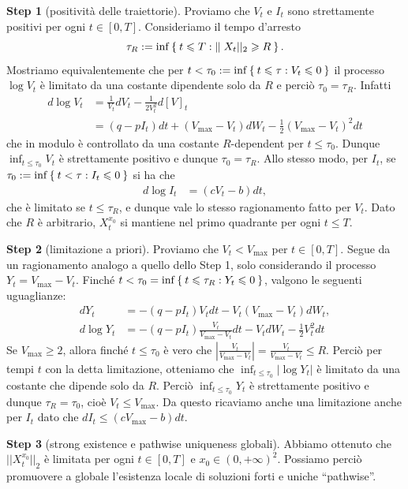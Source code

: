 \documentclass[12pt,a4paper,oneside]{article}
\renewcommand{\geq}{\geqslant}
\renewcommand{\leq}{\leqslant}
\theoremstyle{definition}
\begin{document}
\textbf{Step 1} (positività delle traiettorie). Proviamo che $V_t$ e $I_t$ sono strettamente positivi per ogni $t\in [0,T]$. Consideriamo il tempo d'arresto $$\tau_R := \inf \Set{t\leq T : ||X_t||_2\geq R}.$$
Mostriamo equivalentemente che per $t< \tau_0:=\inf\Set{t\leq \tau : V_t \leq 0}$ il processo $\log V_t$ è limitato da una costante dipendente solo da $R$ e perciò $\tau_0=\tau_R$. Infatti \begin{align*}
d\log V_t & = \frac{1}{V_t} dV_t -\frac{1}{2V_t^2} d[V]_t \\
&= (q-pI_t)dt + (V_{\max}-V_t)dW_t -\frac{1}{2}(V_{\max}-V_t)^2dt 
\end{align*}
che in modulo è controllato da una costante $R$-dependent per $t\leq \tau_0$. Dunque $\inf_{t\leq \tau_0}V_t$ è strettamente positivo e dunque $\tau_0=\tau_R$. Allo stesso modo, per $I_t$, se $\tau_0:=\inf\Set{t< \tau : I_t \leq 0}$ si ha che \begin{align*}
d\log I_t &= (cV_t-b)dt,
\end{align*}
che è limitato se $t\leq \tau_R$, e dunque vale lo stesso ragionamento fatto per $V_t$. Dato che $R$ è arbitrario, $X_t^{x_0}$ si mantiene nel primo quadrante per ogni $t\leq T$. 

\textbf{Step 2} (limitazione a priori). Proviamo che $V_t<V_{\max}$ per $t\in [0,T]$. Segue da un ragionamento analogo a quello dello Step 1, solo considerando il processo $Y_t=V_{\max}-V_t$. Finché $t< \tau_0=\inf \Set{t\leq \tau_R: Y_t\leq 0}$, valgono le seguenti uguaglianze: \begin{align*}
dY_t &= -(q-pI_t)V_tdt - V_t(V_{\max}-V_t)dW_t, \\
d\log Y_t &= -(q-pI_t)\frac{V_t}{V_{\max}-V_t} dt - V_tdW_t -\frac{1}{2}V_t^2dt
\end{align*}
Se $V_{\max}\geq 2$, allora finché $t\leq \tau_0$ è vero che $\left|\frac{V_t}{V_{\max}-V_t} \right|=\frac{V_t}{V_{\max}-V_t}\leq R$. Perciò per tempi $t$ con la detta limitazione, otteniamo che $\inf_{t\leq \tau_0}|\log Y_t|$ è limitato da una costante che dipende solo da $R$. Perciò $\inf_{t\leq \tau_0} {Y_t}$ è strettamente positivo e dunque $\tau_R=\tau_0$, cioè $V_t\leq V_{\max}$. Da questo ricaviamo anche una limitazione anche per $I_t$ dato che $dI_t \leq (cV_{\max}-b)dt$.

\textbf{Step 3} (strong existence e pathwise uniqueness globali). Abbiamo ottenuto che $||X_t^{x_0}||_2$ è limitata per ogni $t\in [0,T]$ e $x_0\in (0,+\infty)^2$. Possiamo perciò promuovere a globale l'esistenza locale di soluzioni forti e uniche ``pathwise''. 
\end{document}
